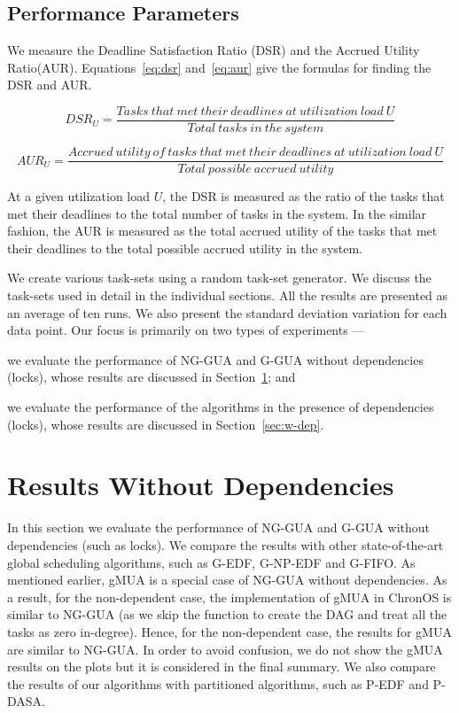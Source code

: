 \documentclass[12pt,dvips]{report}
\begin{document}
\subsection{Performance Parameters}

We measure the Deadline Satisfaction Ratio (DSR) 
and the Accrued Utility Ratio(AUR). 
Equations~\ref{eq:dsr} and~\ref{eq:aur} give the formulas for finding the DSR and AUR.

\begin{equation}
	\label{eq:dsr}
	DSR_U = \frac{Tasks~that~met~their~deadlines~at~utilization~load~U}{Total~tasks~in~the~system}
\end{equation}

\begin{equation}
	\label{eq:aur}
	AUR_U = \frac{Accrued~utility~of~tasks~that~met~their~deadlines~at~utilization~load~U}{Total~possible~accrued~utility}
\end{equation}

At a given utilization load $U$, the DSR is measured as the ratio of the tasks that met their deadlines to the total number of tasks in the system. In the similar fashion, the AUR is measured as the total accrued utility of the tasks that met their deadlines to the total possible accrued utility in the system.

We create various task-sets using a random task-set generator. We discuss the task-sets used in detail in the individual sections. All the results are presented as an average of ten runs. We also present the standard deviation variation for each data point. Our focus is primarily on two types of experiments ---
\begin{inparaenum}[(1)]
 \item we evaluate the performance of NG-GUA and G-GUA without dependencies (locks), whose results are discussed in Section~\ref{sec:wo-dep}; and
 \item we evaluate the performance of the algorithms in the presence of dependencies (locks), whose results are discussed in Section~\ref{sec:w-dep}.
\end{inparaenum}

\section{Results Without Dependencies}\label{sec:wo-dep}

In this section we evaluate the performance of NG-GUA and G-GUA without dependencies (such as locks). We compare the results with other state-of-the-art global scheduling algorithms, such as G-EDF, G-NP-EDF and G-FIFO. As mentioned earlier, gMUA is a special case of NG-GUA without dependencies. As a result, for the non-dependent case, the implementation of gMUA in ChronOS is similar to NG-GUA (as we skip the function to create the DAG and treat all the tasks as zero in-degree). Hence, for the non-dependent case, the results for gMUA are similar to NG-GUA. In order to avoid confusion, we do not show the gMUA results on the plots but it is considered in the final summary. We also compare the results of our algorithms with partitioned algorithms, such as P-EDF and P-DASA. 
\end{document}
